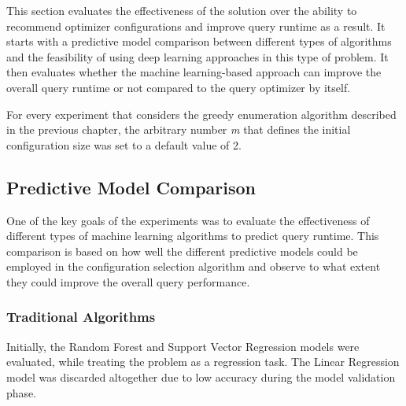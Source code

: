 \label{sec:query_performance_analysis}

This section evaluates the effectiveness of the solution over the ability to recommend optimizer configurations and improve query runtime as a result. It starts with a predictive model comparison between different types of algorithms and the feasibility of using deep learning approaches in this type of problem. It then evaluates whether the machine learning-based approach can improve the overall query runtime or not compared to the query optimizer by itself.

For every experiment that considers the greedy enumeration algorithm described in the previous chapter, the arbitrary number \textit{m} that defines the initial configuration size was set to a default value of 2.

\subsection{Predictive Model Comparison}

One of the key goals of the experiments was to evaluate the effectiveness of different types of machine learning algorithms to predict query runtime. This comparison is based on how well the different predictive models could be employed in the configuration selection algorithm and observe to what extent they could improve the overall query performance.

\subsubsection{Traditional Algorithms}

Initially, the Random Forest and Support Vector Regression models were evaluated, while treating the problem as a regression task. The Linear Regression model was discarded altogether due to low accuracy during the model validation phase.

